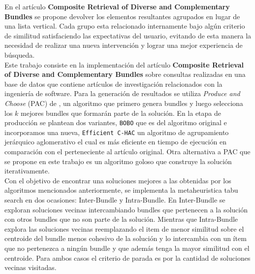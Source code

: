 En el artículo \textbf{Composite Retrieval of Diverse and Complementary Bundles}\cite{compositeRetrival} se propone devolver los elementos resultantes agrupados en lugar de una lista vertical. Cada grupo esta relacionado internamente bajo algún criterio de similitud satisfaciendo las expectativas del usuario, evitando de esta manera la necesidad de realizar una nueva intervención y lograr una mejor experiencia de búsqueda.\\
Este trabajo consiste en la implementación del artículo \textbf{Composite Retrieval of Diverse and Complementary Bundles} sobre consultas realizadas en una base de datos que contiene artículos de investigación relacionados con la ingeniería de software. Para la generación de resultados se utiliza \textit{Produce and Choose} (PAC) de \cite{compositeRetrival}, un algoritmo que primero genera bundles y luego selecciona los $k$ mejores bundles que formarán parte de la solución. En la etapa de producción se plantean dos variantes, \texttt{BOBO} que es del algoritmo original e incorporamos una nueva, \texttt{Efficient C-HAC} un algoritmo de agrupamiento jerárquico aglomerativo el cual es más eficiente en tiempo de ejecución en comparación con el perteneciente al artículo original. Otra alternativa a PAC que se propone en este trabajo es un algoritmo goloso que construye la solución iterativamente.\\
Con el objetivo de encontrar una soluciones mejores a las obtenidas por los algoritmos mencionados anteriormente, se implementa la metaheuristica tabu search en dos ocasiones: Inter-Bundle y Intra-Bundle. En Inter-Bundle se exploran soluciones vecinas intercambiando bundles que pertenecen a la solución con otros bundles que no son parte de la solución. Mientras que Intra-Bundle explora las soluciones vecinas reemplazando el item de menor similitud sobre el centroide del bundle menos cohesivo de la solución y lo intercambia con un ítem que no pertenezca a ningún bundle y que además tenga la mayor similitud con el centroide. Para ambos casos el criterio de parada es por la cantidad de soluciones vecinas visitadas.\\


